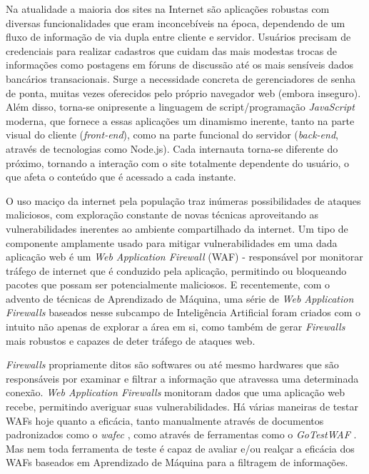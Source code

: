 Na atualidade a maioria dos sites na Internet são aplicações robustas com diversas funcionalidades que eram inconcebíveis na época, dependendo de um fluxo de informação de via dupla entre cliente e servidor. Usuários precisam de credenciais para realizar cadastros que cuidam das mais modestas trocas de informações como postagens em fóruns de discussão até os mais sensíveis dados bancários transacionais. Surge a necessidade concreta de gerenciadores de senha de ponta, muitas vezes oferecidos pelo próprio navegador web (embora inseguro). Além disso, torna-se onipresente a linguagem de script/programação \textit{JavaScript} moderna, que fornece a essas aplicações um dinamismo inerente, tanto na parte visual do cliente (\textit{front-end}), como na parte funcional do servidor (\textit{back-end}, através de tecnologias como Node.js). Cada internauta torna-se diferente do próximo, tornando a interação com o site totalmente dependente do usuário, o que afeta o conteúdo que é acessado a cada instante.

O uso maciço da internet pela população traz inúmeras possibilidades de ataques maliciosos, com exploração constante de novas técnicas aproveitando as vulnerabilidades inerentes ao ambiente compartilhado da internet. Um tipo de componente amplamente usado para mitigar vulnerabilidades em uma dada aplicação web é um \textit{Web Application Firewall} (WAF) - responsável por monitorar tráfego de internet que é conduzido pela aplicação, permitindo ou bloqueando pacotes que possam ser potencialmente maliciosos. E recentemente, com o advento de técnicas de Aprendizado de Máquina, uma série de \textit{Web Application Firewalls} baseados nesse subcampo de Inteligência Artificial foram criados com o intuito não apenas de explorar a área em si, como também de gerar \textit{Firewalls} mais robustos e capazes de deter tráfego de ataques web. 

\textit{Firewalls} propriamente ditos são softwares ou até mesmo hardwares que são responsáveis por examinar e filtrar a informação que atravessa uma determinada conexão. \textit{Web Application Firewalls} monitoram dados que uma aplicação web recebe, permitindo averiguar suas vulnerabilidades. Há várias maneiras de testar WAFs hoje quanto a eficácia, tanto manualmente através de documentos padronizados como o \textit{wafec} \cite{wafec_doc}, como através de ferramentas como o \textit{GoTestWAF} \cite{gotestwaf_wallarm}. Mas nem toda ferramenta de teste é capaz de avaliar e/ou realçar a eficácia dos WAFs baseados em Aprendizado de Máquina para a filtragem de informações.

